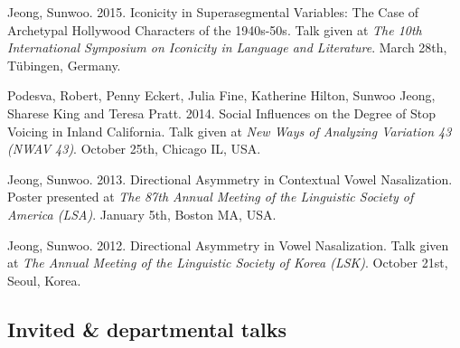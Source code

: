 \documentclass[letterpaper]{article}
\renewenvironment{itemize}{
  \begin{list}{}{
    \setlength{\leftmargin}{1.5em}
  }
}{
  \end{list}
}
\begin{document}
\begin{itemize}
\item Jeong, Sunwoo. 2015. Iconicity in Superasegmental Variables: The Case of Archetypal Hollywood Characters of the 1940s-50s. Talk given at {\it The 10th International Symposium on Iconicity in Language and Literature}. March 28th, T{\"u}bingen, Germany.

\item Podesva, Robert, Penny Eckert, Julia Fine, Katherine Hilton, Sunwoo Jeong, Sharese King and Teresa Pratt. 2014. Social Influences on the Degree of Stop Voicing in Inland California. Talk given at {\it New Ways of Analyzing Variation 43 (NWAV 43)}. October 25th, Chicago IL, USA.

\item Jeong, Sunwoo. 2013. Directional Asymmetry in Contextual Vowel Nasalization. Poster presented at {\it The 87th Annual Meeting of the Linguistic Society of America (LSA)}. January 5th, Boston MA, USA.

\item Jeong, Sunwoo. 2012. Directional Asymmetry in Vowel Nasalization. Talk given at {\it The Annual Meeting of the Linguistic Society of Korea (LSK)}. October 21st, Seoul, Korea.

\end{itemize}


\subsection*{Invited \& departmental talks}
\end{document}
